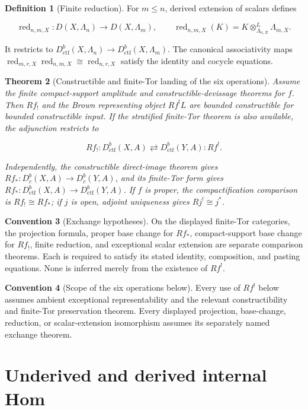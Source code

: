 \documentclass[10pt]{article}
\newtheorem{theorem}{Theorem}[section]
\theoremstyle{definition}
\newtheorem{definition}[theorem]{Definition}
\newtheorem{convention}[theorem]{Convention}
\newcommand{\Dbc}{D^b_c}
\newcommand{\Dctf}{D^b_{\mathrm{ctf}}}
\newcommand{\red}{\operatorname{red}}
\begin{document}
\begin{definition}[Finite reduction]
For \(m\leq n\), derived extension of scalars defines

\[
 \red_{n,m,X}:D(X,\Lambda_n)\longrightarrow D(X,\Lambda_m),
 \qquad
 \red_{n,m,X}(K)=K\otimes^L_{\Lambda_{n,X}}\Lambda_{m,X}.
\]

It restricts to \(\Dctf(X,\Lambda_n)\to\Dctf(X,\Lambda_m)\).  The canonical
associativity maps
\(\red_{m,r,X}\red_{n,m,X}\cong\red_{n,r,X}\) satisfy the identity and
cocycle equations.
\end{definition}

\begin{theorem}[Constructible and finite-Tor landing of the six operations]
Assume the finite compact-support amplitude and constructible-devissage
theorems for \(f\).  Then \(Rf_!\) and the Brown representing object \(Rf^!L\)
are bounded constructible for bounded constructible input.  If the
stratified finite-Tor theorem is also available, the adjunction restricts to

\[
 Rf_!: \Dctf(X,A)\rightleftarrows\Dctf(Y,A):Rf^!.
\]

Independently, the constructible direct-image theorem gives
\(Rf_*:\Dbc(X,A)\to\Dbc(Y,A)\), and its finite-Tor form gives
\(Rf_*:\Dctf(X,A)\to\Dctf(Y,A)\).  If \(f\) is proper, the compactification
comparison is \(Rf_!\cong Rf_*\); if \(j\) is open, adjoint uniqueness gives
\(Rj^!\cong j^*\).
\end{theorem}

\begin{convention}[Exchange hypotheses]
On the displayed finite-Tor categories, the projection formula, proper base
change for \(Rf_*\), compact-support base change for \(Rf_!\), finite
reduction, and exceptional scalar extension are separate comparison
theorems.  Each is required to satisfy its stated identity, composition, and
pasting equations.  None is inferred merely from the existence of \(Rf^!\).
\end{convention}

\begin{convention}[Scope of the six operations below]
Every use of \(Rf^!\) below assumes ambient exceptional representability and
the relevant constructibility and finite-Tor preservation theorem.  Every
displayed projection, base-change, reduction, or scalar-extension
isomorphism assumes its separately named exchange theorem.
\end{convention}

\section{Underived and derived internal Hom}
\end{document}

